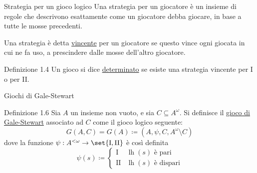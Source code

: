 \documentclass[babel]{beamer}
\renewcommand{\href}[2]{#2}
\begin{document}
\begin{frame}[label={sec:org153fabe}]{Strategia per un gioco logico}
Una strategia per un giocatore è un insieme di regole che descrivono esattamente come un giocatore debba giocare, in base a tutte le mosse precedenti.

Una strategia è detta \uline{vincente} per un giocatore se questo vince ogni giocata in cui ne fa uso, a prescindere dalle mosse dell'altro giocatore.
\begin{block}{Definizione 1.4}
Un gioco si dice \uline{determinato} se esiste una strategia vincente per I o per II.
\end{block}
\end{frame}
\begin{frame}[label={sec:org4cc428c}]{Giochi di Gale-Stewart}
\begin{block}{Definizione 1.6}
Sia \(A\) un \href{../../../../../../../org/roam/20250130104331-insieme_mk.org}{insieme} non vuoto, e sia \(C \subseteq A^{\omega}\). Si definisce il \uline{gioco di Gale-Stewart} associato ad \(C\) come il \href{../../../../../../../org/roam/20250513155732-logic_game.org}{gioco logico} seguente:
\begin{equation*}
G(A,C) = G(A) \coloneqq (A, \psi, C, A^{\omega}\setminus C)
\end{equation*}
dove la \href{../../../../../../../org/roam/20250202170607-classe_relazione_binaria.org}{funzione} \(\psi: A^{<\omega}\to \set{\text{I},\text{II}}\) è così definita
\begin{equation*}
\psi(s) \coloneqq \begin{cases}
\text{I} & \operatorname{lh}(s)\text{ è pari}\\
\text{II} & \operatorname{lh}(s)\text{ è dispari}
\end{cases}
\end{equation*}
\end{block}
\end{frame}
\end{document}
